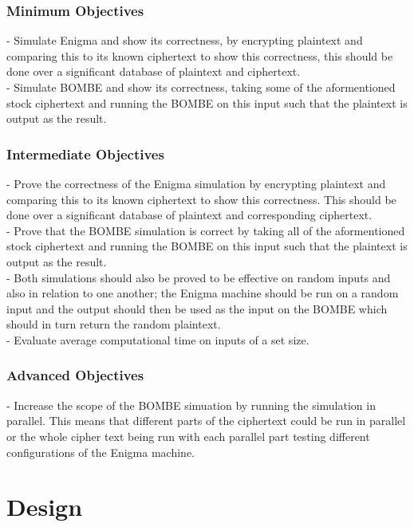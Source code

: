 \documentclass[12pt,a4paper]{article}
\begin{document}
\subsubsection{Minimum Objectives}

- Simulate Enigma and show its correctness, by encrypting plaintext and comparing this to its known ciphertext to show this correctness, this should be done over a significant database of plaintext and ciphertext.\\
- Simulate BOMBE and show its correctness, taking some of the aformentioned stock ciphertext and running the BOMBE on this input such that the plaintext is output as the result.

\subsubsection{Intermediate Objectives}

- Prove the correctness of the Enigma simulation by encrypting plaintext and comparing this to its known ciphertext to show this correctness. This should be done over a significant database of plaintext and corresponding  ciphertext.\\
- Prove that the BOMBE simulation is correct by taking all of the aformentioned stock ciphertext and running the BOMBE on this input such that the plaintext is output as the result.\\
- Both simulations should also be proved to be effective on random inputs and also in relation to one another; the Enigma machine should be run on a random input and the output should then be used as the input on the BOMBE which should in turn return the random plaintext.\\
- Evaluate average computational time on inputs of a set size.

\subsubsection{Advanced Objectives}

- Increase the scope of the BOMBE simuation by running the simulation in parallel. This means that different parts of the ciphertext could be run in parallel or the whole cipher text being run with each parallel part testing different configurations of the Enigma machine.



\section{Design}
\end{document}

